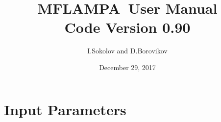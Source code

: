 \documentclass[twoside,10pt]{book}
\title{MFLAMPA\ User Manual \\ \large Code Version 0.90}
\author{I.Sokolov and D.Borovikov }
\date{December 29, 2017}
\begin{document}
\pagestyle{headings}

\maketitle

\tableofcontents

\chapter{Input Parameters \label{chapter:param}}

\end{document}

